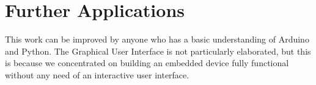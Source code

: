 \section{Further Applications}\label{sec:further}
This work can be improved by anyone who has a basic understanding of Arduino and Python. The Graphical User Interface is not particularly elaborated, but this is because we concentrated on building an embedded device fully functional without any need of an interactive user interface.